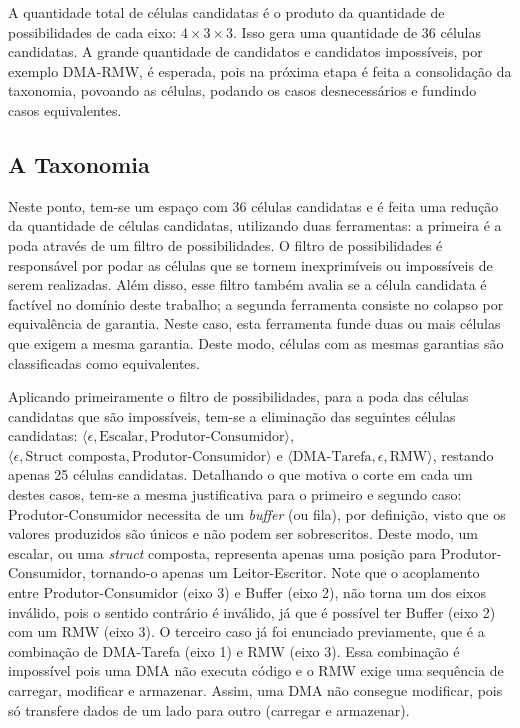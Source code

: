 A quantidade total de células candidatas é o produto da quantidade de possibilidades de cada eixo: $4 \times 3 \times 3$. Isso gera uma quantidade de 36 células candidatas. A grande quantidade de candidatos e candidatos impossíveis, por exemplo DMA-RMW, é esperada, pois na próxima etapa é feita a consolidação da taxonomia, povoando as células, podando os casos desnecessários e fundindo casos equivalentes.

\subsection{A Taxonomia}
\label{subsec:taxonomy}

Neste ponto, tem-se um espaço com 36 células candidatas e é feita uma redução da quantidade de células candidatas, utilizando duas ferramentas: a primeira é a poda através de um filtro de possibilidades. O filtro de possibilidades é responsável por podar as células que se tornem inexprimíveis ou impossíveis de serem realizadas. Além disso, esse filtro também avalia se a célula candidata é factível no domínio deste trabalho; a segunda ferramenta consiste no colapso por equivalência de garantia. Neste caso, esta ferramenta funde duas ou mais células que exigem a mesma garantia. Deste modo, células com as mesmas garantias são classificadas como equivalentes.

\begin{sloppypar}
Aplicando primeiramente o filtro de possibilidades, para a poda das células candidatas que são impossíveis, tem-se a eliminação das seguintes células candidatas: $\langle\epsilon, \text{Escalar}, \text{Produtor-Consumidor}\rangle$, $\langle\epsilon, \text{Struct composta}, \text{Produtor-Consumidor}\rangle$ e $\langle\text{DMA-Tarefa}, \epsilon, \text{RMW}\rangle$, restando apenas 25 células candidatas. Detalhando o que motiva o corte em cada um destes casos, tem-se a mesma justificativa para o primeiro e segundo caso: Produtor-Consumidor necessita de um \textit{buffer} (ou fila), por definição, visto que os valores produzidos são únicos e não podem ser sobrescritos. Deste modo, um escalar, ou uma \textit{struct} composta, representa apenas uma posição para Produtor-Consumidor, tornando-o apenas um Leitor-Escritor. Note que o acoplamento entre Produtor-Consumidor (eixo 3) e Buffer (eixo 2), não torna um dos eixos inválido, pois o sentido contrário é inválido, já que é possível ter Buffer (eixo 2) com um \ac{RMW} (eixo 3). O terceiro caso já foi enunciado previamente, que é a combinação de DMA-Tarefa (eixo 1) e \ac{RMW} (eixo 3). Essa combinação é impossível pois uma \ac{DMA} não executa código e o \ac{RMW} exige uma sequência de carregar, modificar e armazenar. Assim, uma \ac{DMA} não consegue modificar, pois só transfere dados de um lado para outro (carregar e armazenar).
\end{sloppypar}


